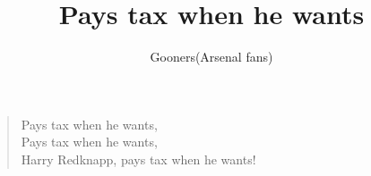 \documentclass[a4paper,12pt]{article}
\title{Pays tax when he wants}
\author{Gooners(Arsenal fans)}
\date{}
\begin{document}
	
	\maketitle
	
	\begin{verse}
		
		Pays tax when he wants, \\ 
		Pays tax when he wants, \\
		Harry Redknapp, pays tax when he wants!
		
	\end{verse}
	
\end{document}
